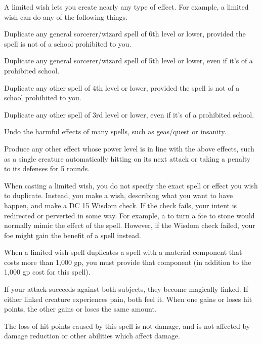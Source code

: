 \begin{spelleffect}
  A limited wish lets you create nearly any type of effect. For example, a limited wish can do any of the following things.
  \begin{itemize*}
    \item Duplicate any general sorcerer/wizard spell of 6th level or lower, provided the spell is not of a school prohibited to you.
    \item Duplicate any general sorcerer/wizard spell of 5th level or lower, even if it's of a prohibited school.
    \item Duplicate any other spell of 4th level or lower, provided the spell is not of a school prohibited to you.
    \item Duplicate any other spell of 3rd level or lower, even if it's of a prohibited school.
    \item Undo the harmful effects of many spells, such as geas/quest or insanity.
    \item Produce any other effect whose power level is in line with the above effects, such as a single creature automatically hitting on its next attack or taking a  penalty to its defenses for 5 rounds.
  \end{itemize*}
  \par When casting a limited wish, you do not specify the exact spell or effect you wish to duplicate. Instead, you make a wish, describing what you want to have happen, and make a DC 15 Wisdom check. If the check fails, your intent is redirected or perverted in some way. For example, a  to turn a foe to stone would normally mimic the  effect of the  spell. However, if the Wisdom check failed, your foe might gain the benefit of a  spell instead.
  \par When a limited wish spell duplicates a spell with a material component that costs more than 1,000 gp, you must provide that component (in addition to the 1,000 gp cost for this spell).
\end{spelleffect}

\spelldur{\durshort}
\begin{spelleffect}
    If your attack succeeds against both subjects, they become magically linked. If either linked creature experiences pain, both feel it. When one gains or loses hit points, the other gains or loses the same amount.
\end{spelleffect}
\begin{spellnotes}
  The loss of hit points caused by this spell is not damage, and is not affected by damage reduction or other abilities which affect damage.
\end{spellnotes}

